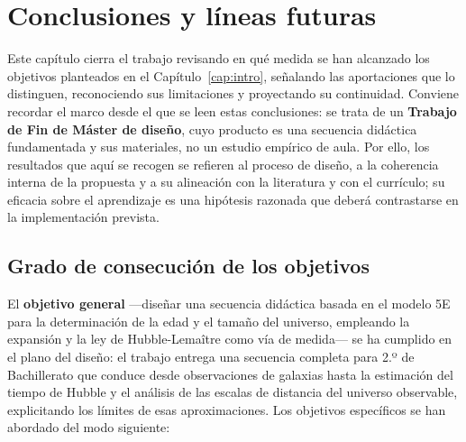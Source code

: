 \chapter{Conclusiones y líneas futuras}\label{cap:conclusiones}

Este capítulo cierra el trabajo revisando en qué medida se han alcanzado los objetivos planteados en el Capítulo~\ref{cap:intro}, señalando las aportaciones que lo distinguen, reconociendo sus limitaciones y proyectando su continuidad. Conviene recordar el marco desde el que se leen estas conclusiones: se trata de un \textbf{Trabajo de Fin de Máster de diseño}, cuyo producto es una secuencia didáctica fundamentada y sus materiales, no un estudio empírico de aula. Por ello, los resultados que aquí se recogen se refieren al proceso de diseño, a la coherencia interna de la propuesta y a su alineación con la literatura y con el currículo; su eficacia sobre el aprendizaje es una hipótesis razonada que deberá contrastarse en la implementación prevista.

\section{Grado de consecución de los objetivos}

El \textbf{objetivo general} ---diseñar una secuencia didáctica basada en el modelo 5E para la determinación de la edad y el tamaño del universo, empleando la expansión y la ley de Hubble-Lemaître como vía de medida--- se ha cumplido en el plano del diseño: el trabajo entrega una secuencia completa para 2.º de Bachillerato que conduce desde observaciones de galaxias hasta la estimación del tiempo de Hubble y el análisis de las escalas de distancia del universo observable, explicitando los límites de esas aproximaciones. Los objetivos específicos se han abordado del modo siguiente:

